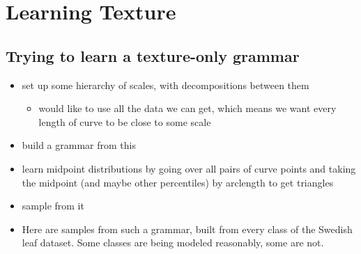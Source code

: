 \documentclass{book}
\begin{document}
\section{Learning Texture}
\label{sec-3_8}
\subsection{Trying to learn a texture-only grammar}
\label{sec-3_8_1}

\begin{itemize}
\item set up some hierarchy of scales, with decompositions between them

\begin{itemize}
\item would like to use all the data we can get, which means we want
      every length of curve to be close to some scale
\end{itemize}

\item build a grammar from this
\item learn midpoint distributions by going over all pairs of curve
    points and taking the midpoint (and maybe other percentiles) by
    arclength to get triangles
\item sample from it
\item Here are samples from such a grammar, built from every class of
    the Swedish leaf dataset. Some classes are being modeled
    reasonably, some are not.
\end{itemize}
\end{document}
